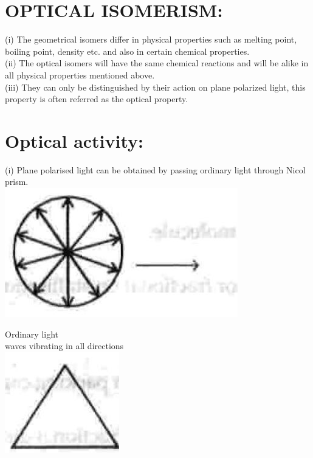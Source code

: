 \documentclass[10pt]{article}
\begin{document}
\section*{OPTICAL ISOMERISM:}
(i) The geometrical isomers differ in physical properties such as melting point, boiling point, density etc. and also in certain chemical properties.\\
(ii) The optical isomers will have the same chemical reactions and will be alike in all physical properties mentioned above.\\
(iii) They can only be distinguished by their action on plane polarized light, this property is often referred as the optical property.

\section*{Optical activity:}
(i) Plane polarised light can be obtained by passing ordinary light through Nicol prism.\\
\includegraphics[max width=\textwidth, center]{2025_01_28_8470952b98110cec3aabg-048(1)}

Ordinary light\\
waves vibrating in all directions\\
\includegraphics[max width=\textwidth, center]{2025_01_28_8470952b98110cec3aabg-048(7)}
\end{document}
